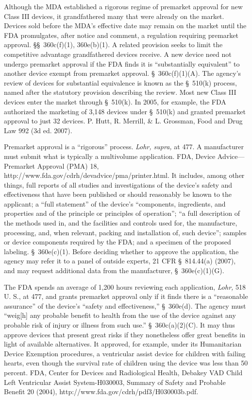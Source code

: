 {  Although the MDA established a rigorous regime of premarket approval
for new Class III devices, it grandfathered many that were already
on the market. Devices sold before the MDA's effective date may
remain on the market until the FDA promulgates, after notice and
comment, a regulation requiring premarket approval. \S\S~360c(f)(1),
360e(b)(1). A related provision seeks to limit the competitive
advantage grandfathered devices receive. A new device need not undergo
premarket approval if the FDA finds it is ``substantially equivalent''
to another device exempt from premarket approval. \S~360c(f)(1)(A).
The agency's review of devices for substantial equivalence is known as
the \S~510(k) process, named after the statutory provision describing
the review. Most new Class III devices enter the market through
\S~510(k). In 2005, for example, the FDA authorized the marketing of
3,148 devices under \S~510(k) and granted premarket approval to just 32
devices. P. Hutt, R. Merrill, \& L. Grossman, Food and Drug Law 992 (3d
ed. 2007).

  Premarket approval is a ``rigorous'' process. \emph{Lohr, supra,}
at 477. A manufacturer must submit what is typically a multivolume
application. FDA, Device Advice---Premar\newpage ket Approval (PMA)
18, http://www.fda.gov/cdrh/devadvice/pma/printer.html. It includes,
among other things, full reports of all studies and investigations of
the device's safety and effectiveness that have been published or
should reasonably be known to the applicant; a ``full statement''
of the device's ``components, ingredients, and properties and of
the principle or principles of operation''; ``a full description of
the methods used in, and the facilities and controls used for, the
manufacture, processing, and, when relevant, packing and installation
of, such device''; samples or device components required by the FDA;
and a specimen of the proposed labeling. \S~360e(c)(1). Before deciding
whether to approve the application, the agency may refer it to a panel
of outside experts, 21 CFR \S~814.44(a) (2007), and may request
additional data from the manufacturer, \S~360e(c)(1)(G).

  The FDA spends an average of 1,200 hours reviewing each application,
\emph{Lohr,} 518 U. S., at 477, and grants premarket approval
only if it finds there is a ``reasonable assurance'' of the
device's ``safety and effectiveness,'' \S~360e(d). The agency
must ``weig[h] any probable benefit to health from the use of the
device against any probable risk of injury or illness from such use.''
\S~360c(a)(2)(C). It may thus approve devices that present great
risks if they nonetheless offer great benefits in light of available
alternatives. It approved, for example, under its Humanitarian Device
Exemption procedures, a ventricular assist device for children with
failing hearts, even though the survival rate of children using
the device was less than 50 percent. FDA, Center for Devices and
Radiological Health, Debakey VAD Child Left Ventricular Assist
System-H030003, Summary of Safety and Probable Benefit 20 (2004),
http://www.fda.gov/cdrh/pdf3/H030003b.pdf.

}
